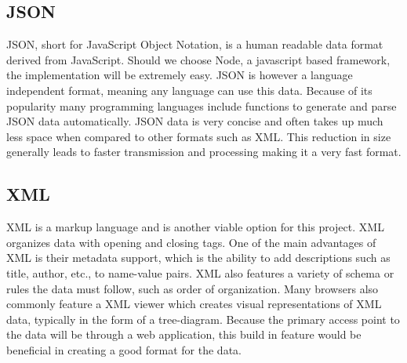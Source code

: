 \documentclass[letterpaper,10pt,draftclsnofoot,onecolumn,]{article}
\begin{document}
\subsection*{JSON}
JSON, short for JavaScript Object Notation, is a human readable data format derived from JavaScript. Should we choose Node, a javascript based framework, the implementation will be extremely easy. JSON is however a language independent format, meaning any language can use this data. Because of its popularity many programming languages include functions to generate and parse JSON data automatically.
JSON data is very concise and often takes up much less space when compared to other formats such as XML.\cite{nurseitov2009comparison} This reduction in size generally leads to faster transmission and processing making it a very fast format. 
\subsection*{XML}
XML is a markup language and is another viable option for this project.  XML organizes data with opening and closing tags. One of the main advantages of XML is their metadata support, which is the ability to add descriptions such as title, author, etc., to name-value pairs.\cite{JSONvsXML} XML also features a variety of schema or rules the data must follow, such as order of organization. Many browsers also commonly feature a XML viewer which creates visual representations of XML data, typically in the form of a tree-diagram. Because the primary access point to the data will be through a web application, this build in feature would be beneficial in creating a good format for the data.
  


\end{document}
